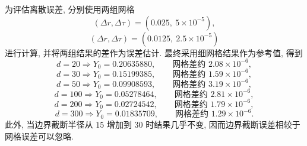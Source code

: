     为评估离散误差, 分别使用两组网格
    \begin{equation}
      (\Delta r,\Delta \tau)=(0.025,\ 5\times 10^{-5}),
    \end{equation}
    \begin{equation}
      (\Delta r,\Delta \tau)=(0.0125,\ 2.5\times 10^{-5})
    \end{equation}
    进行计算, 并将两组结果的差作为误差估计.
    最终采用细网格结果作为参考值, 得到
    \begin{equation}
      d=20 \Rightarrow Y_0=0.20635880,\qquad
      \text{网格差约 }2.08\times 10^{-6},
    \end{equation}
    \begin{equation}
      d=30 \Rightarrow Y_0=0.15199385,\qquad
      \text{网格差约 }1.59\times 10^{-6},
    \end{equation}
    \begin{equation}
      d=50 \Rightarrow Y_0=0.09908593,\qquad
      \text{网格差约 }3.19\times 10^{-6},
    \end{equation}
    \begin{equation}
      d=100 \Rightarrow Y_0=0.05278464,\qquad
      \text{网格差约 }2.81\times 10^{-6},
    \end{equation}
    \begin{equation}
      d=200 \Rightarrow Y_0=0.02724542,\qquad
      \text{网格差约 }1.79\times 10^{-6},
    \end{equation}
    \begin{equation}
      d=300 \Rightarrow Y_0=0.01835709,\qquad
      \text{网格差约 }1.29\times 10^{-6}.
    \end{equation}
    此外, 当边界截断半径从 $15$ 增加到 $30$ 时结果几乎不变,
    因而边界截断误差相较于网格误差可以忽略.
